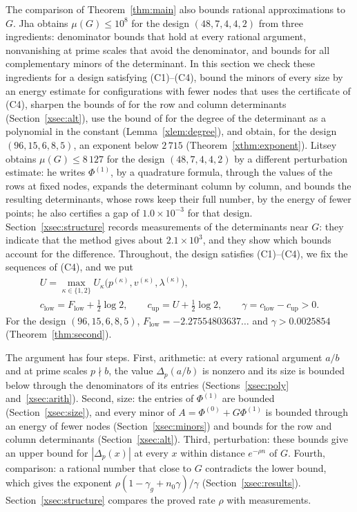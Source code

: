 \documentclass[11pt]{article}
\theoremstyle{definition}
\begin{document}
The comparison of Theorem~\ref{thm:main} also bounds rational approximations to $G$. Jha \cite{Jha} obtains $\mu(G)\le10^8$ for the design $(48,7,4,4,2)$ from three ingredients: denominator bounds that hold at every rational argument, nonvanishing at prime scales that avoid the denominator, and bounds for all complementary minors of the determinant. In this section we check these ingredients for a design satisfying (C1)--(C4), bound the minors of every size by an energy estimate for configurations with fewer nodes that uses the certificate of (C4), sharpen the bounds of \cite{Jha} for the row and column determinants (Section~\ref{xsec:alt}), use the bound of \cite{Litsey} for the degree of the determinant as a polynomial in the constant (Lemma~\ref{xlem:degree}), and obtain, for the design $(96,15,6,8,5)$, an exponent below $2\,715$ (Theorem~\ref{xthm:exponent}). Litsey \cite{Litsey} obtains $\mu(G)\le8\,127$ for the design $(48,7,4,4,2)$ by a different perturbation estimate: he writes $\Phi^{(1)}$, by a quadrature formula, through the values of the rows at fixed nodes, expands the determinant column by column, and bounds the resulting determinants, whose rows keep their full number, by the energy of fewer points; he also certifies a gap of $1.0\times10^{-3}$ for that design. Section~\ref{xsec:structure} records measurements of the determinants near $G$: they indicate that the method gives about $2.1\times10^3$, and they show which bounds account for the difference. Throughout, the design satisfies (C1)--(C4), we fix the sequences of (C4), and we put
\begin{gather*}
U=\max_{\kappa\in\{1,2\}}U_\kappa\big(p^{(\kappa)},v^{(\kappa)},\lambda^{(\kappa)}\big),\\
c_{\mathrm{low}}=F_{\mathrm{low}}+\tfrac12\log2,\qquad c_{\mathrm{up}}=U+\tfrac12\log2,\qquad \gamma=c_{\mathrm{low}}-c_{\mathrm{up}}>0 .
\end{gather*}
For the design $(96,15,6,8,5)$, $F_{\mathrm{low}}=-2.27554803637\ldots$ and $\gamma>0.0025854$ (Theorem~\ref{thm:second}).

The argument has four steps. First, arithmetic: at every rational argument $a/b$ and at prime scales $p\nmid b$, the value $\Delta_p(a/b)$ is nonzero and its size is bounded below through the denominators of its entries (Sections~\ref{xsec:poly} and~\ref{xsec:arith}). Second, size: the entries of $\Phi^{(1)}$ are bounded (Section~\ref{xsec:size}), and every minor of $A=\Phi^{(0)}+G\Phi^{(1)}$ is bounded through an energy of fewer nodes (Section~\ref{xsec:minors}) and bounds for the row and column determinants (Section~\ref{xsec:alt}). Third, perturbation: these bounds give an upper bound for $|\Delta_p(x)|$ at every $x$ within distance $e^{-\rho n}$ of $G$. Fourth, comparison: a rational number that close to $G$ contradicts the lower bound, which gives the exponent $\rho(1-\gamma_g+n_0\gamma)/\gamma$ (Section~\ref{xsec:results}). Section~\ref{xsec:structure} compares the proved rate $\rho$ with measurements.
\end{document}

